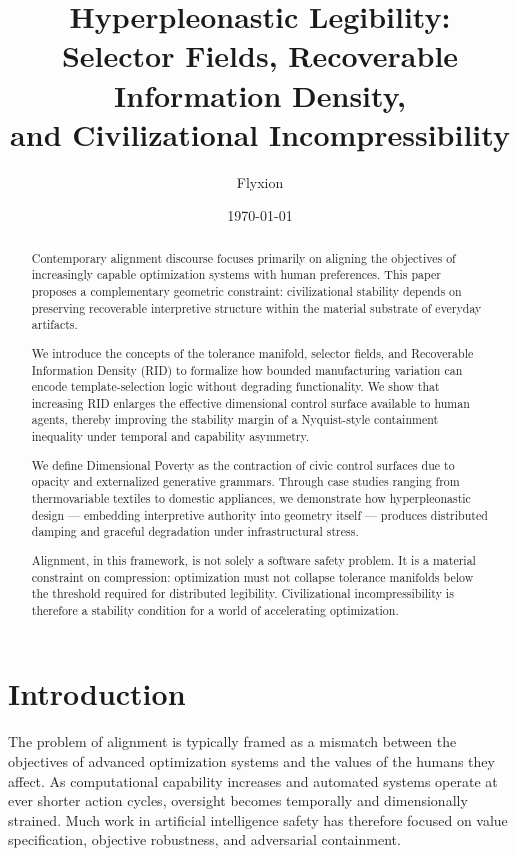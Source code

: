 \documentclass[11pt]{article}
\title{Hyperpleonastic Legibility:\\
Selector Fields, Recoverable Information Density,\\
and Civilizational Incompressibility}
\author{Flyxion}
\date{\today}
\begin{document}
\maketitle

\begin{abstract}

Contemporary alignment discourse focuses primarily on aligning the objectives of increasingly capable optimization systems with human preferences. This paper proposes a complementary geometric constraint: civilizational stability depends on preserving recoverable interpretive structure within the material substrate of everyday artifacts. 

We introduce the concepts of the tolerance manifold, selector fields, and Recoverable Information Density (RID) to formalize how bounded manufacturing variation can encode template-selection logic without degrading functionality. We show that increasing RID enlarges the effective dimensional control surface available to human agents, thereby improving the stability margin of a Nyquist-style containment inequality under temporal and capability asymmetry.

We define Dimensional Poverty as the contraction of civic control surfaces due to opacity and externalized generative grammars. Through case studies ranging from thermovariable textiles to domestic appliances, we demonstrate how hyperpleonastic design — embedding interpretive authority into geometry itself — produces distributed damping and graceful degradation under infrastructural stress.

Alignment, in this framework, is not solely a software safety problem. It is a material constraint on compression: optimization must not collapse tolerance manifolds below the threshold required for distributed legibility. Civilizational incompressibility is therefore a stability condition for a world of accelerating optimization.
\end{abstract}

\newpage
\section{Introduction}

The problem of alignment is typically framed as a mismatch between the objectives of advanced optimization systems and the values of the humans they affect. As computational capability increases and automated systems operate at ever shorter action cycles, oversight becomes temporally and dimensionally strained. Much work in artificial intelligence safety has therefore focused on value specification, objective robustness, and adversarial containment.
\end{document}
